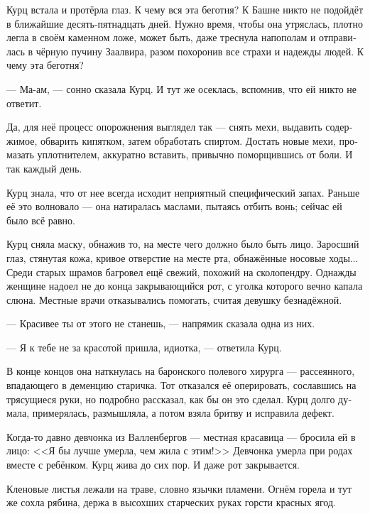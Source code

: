 \documentclass[a4paper,10pt,fleqn]{book}\usepackage{polyglossia}\setdefaultlanguage[babelshorthands=true]{russian}\setotherlanguage{english}\defaultfontfeatures{Ligatures=TeX,Mapping=tex-text}\usepackage{xcolor}\newcommand{\ml}[3]{#2}
\newcommand{\asterism}{\vspace{1em}{\centering\Large\bfseries$\ast~\ast~\ast$\par}\vspace{1em}}
\begin{document}
Курц встала и протёрла глаз.
К чему вся эта беготня?
К Башне никто не подойдёт в ближайшие десять-пятнадцать дней.
Нужно время, чтобы она утряслась, плотно легла в своём каменном ложе, может быть, даже треснула напополам и отправилась в чёрную пучину Заалвира, разом похоронив все страхи и надежды людей.
К чему эта беготня?

--- Ма-ам, --- сонно сказала Курц.
И тут же осеклась, вспомнив, что ей никто не ответит.

\asterism

Да, для неё процесс опорожнения выглядел так --- снять мехи, выдавить содержимое, обварить кипятком, затем обработать спиртом.
Достать новые мехи, промазать уплотнителем, аккуратно вставить, привычно поморщившись от боли.
И так каждый день.

Курц знала, что от нее всегда исходит неприятный специфический запах.
Раньше её это волновало --- она натиралась маслами, пытаясь отбить вонь;
сейчас ей было всё равно.

\asterism

Курц сняла маску, обнажив то, на месте чего должно было быть лицо.
Заросший глаз, стянутая кожа, кривое отверстие на месте рта, обнажённые носовые ходы...
Среди старых шрамов багровел ещё свежий, похожий на сколопендру.
Однажды женщине надоел не до конца закрывающийся рот, с уголка которого вечно капала слюна.
Местные врачи отказывались помогать, считая девушку безнадёжной.

--- Красивее ты от этого не станешь, --- напрямик сказала одна из них.

--- Я к тебе не за красотой пришла, идиотка, --- ответила Курц.

В конце концов она наткнулась на баронского полевого хирурга --- рассеянного, впадающего в деменцию старичка.
Тот отказался её оперировать, сославшись на трясущиеся руки, но подробно рассказал, как бы он это сделал.
Курц долго думала, примерялась, размышляла, а потом взяла бритву и исправила дефект.

Когда-то давно девчонка из Валленбергов --- местная красавица --- бросила ей в лицо:
<<Я бы лучше умерла, чем жила с этим!>>
Девчонка умерла при родах вместе с ребёнком.
Курц жива до сих пор.
И даже рот закрывается.

\asterism

Кленовые листья лежали на траве, словно язычки пламени.
Огнём горела и тут же сохла рябина, держа в высохших старческих руках горсти красных ягод.

\asterism
\end{document}
